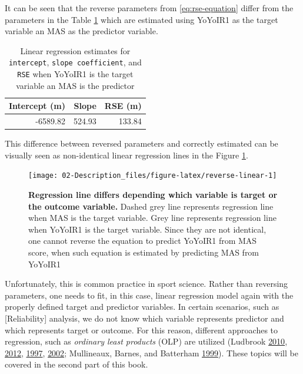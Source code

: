 \documentclass[
]{book}
\begin{document}
It can be seen that the reverse parameters from \eqref{eq:rse-equation} differ from the parameters in the Table \ref{tab:reverse-estimates-table} which are estimated using YoYoIR1 as the target variable an MAS as the predictor variable.



\begin{table}

\caption{\label{tab:reverse-estimates-table}Linear regression estimates for \texttt{intercept}, \texttt{slope\ coefficient}, and \texttt{RSE} when YoYoIR1 is the target variable an MAS is the predictor}
\centering
\begin{tabular}[t]{rrr}
\toprule
Intercept (m) & Slope & RSE (m)\\
\midrule
-6589.82 & 524.93 & 133.84\\
\bottomrule
\end{tabular}
\end{table}

This difference between reversed parameters and correctly estimated can be visually seen as non-identical linear regression lines in the Figure \ref{fig:reverse-linear}.

\begin{figure}

{\centering \texttt{[image: 02-Description\_files/figure-latex/reverse-linear-1]} 

}

\caption{\textbf{Regression line differs depending which variable is target or the outcome variable. }Dashed grey line represents regression line when MAS is the target variable. Grey line represents regression line when YoYoIR1 is the target variable. Since they are not identical, one cannot reverse the equation to predict YoYoIR1 from MAS score, when such equation is estimated by predicting MAS from YoYoIR1}\label{fig:reverse-linear}
\end{figure}



Unfortunately, this is common practice in sport science. Rather than reversing parameters, one needs to fit, in this case, linear regression model again with the properly defined target and predictor variables. In certain scenarios, such as {[}Reliability{]} analysis, we do not know which variable represents predictor and which represents target or outcome. For this reason, different approaches to regression, such as \emph{ordinary least products} (OLP) are utilized (Ludbrook \protect\hyperlink{ref-ludbrookLinearRegressionAnalysis2010}{2010}, \protect\hyperlink{ref-ludbrookPrimerBiomedicalScientists2012}{2012}, \protect\hyperlink{ref-ludbrookSPECIALARTICLECOMPARING1997}{1997}, \protect\hyperlink{ref-ludbrookStatisticalTechniquesComparing2002}{2002}; Mullineaux, Barnes, and Batterham \protect\hyperlink{ref-mullineauxAssessmentBiasComparing1999}{1999}). These topics will be covered in the second part of this book.
\end{document}
